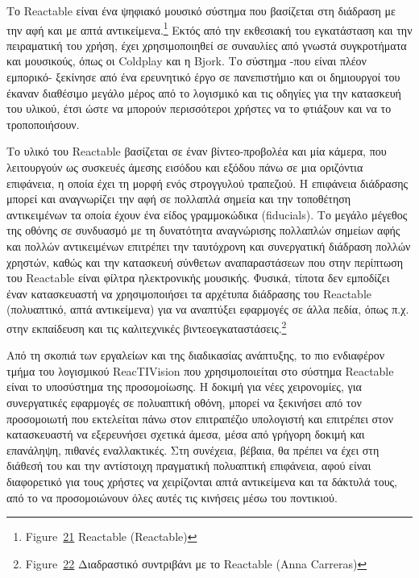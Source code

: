 \documentclass[
]{article}
\begin{document}
Το Reactable είναι ένα ψηφιακό μουσικό σύστημα που βασίζεται στη
διάδραση με την αφή και με απτά αντικείμενα.\footnote{Figure~\protect\hyperlink{fig:reactable-music}{21}
  Reactable (Reactable)} Εκτός από την εκθεσιακή του εγκατάσταση και την
πειραματική του χρήση, έχει χρησιμοποιηθεί σε συναυλίες από γνωστά
συγκροτήματα και μουσικούς, όπως οι Coldplay και η Bjork. Το σύστημα
-που είναι πλέον εμπορικό- ξεκίνησε από ένα ερευνητικό έργο σε
πανεπιστήμιο και οι δημιουργοί του έκαναν διαθέσιμο μεγάλο μέρος από το
λογισμικό και τις οδηγίες για την κατασκευή του υλικού, έτσι ώστε να
μπορούν περισσότεροι χρήστες να το φτιάξουν και να το τροποποιήσουν.

Το υλικό του Reactable βασίζεται σε έναν βίντεο-προβολέα και μία κάμερα,
που λειτουργούν ως συσκευές άμεσης εισόδου και εξόδου πάνω σε μια
οριζόντια επιφάνεια, η οποία έχει τη μορφή ενός στρογγυλού τραπεζιού. Η
επιφάνεια διάδρασης μπορεί και αναγνωρίζει την αφή σε πολλαπλά σημεία
και την τοποθέτηση αντικειμένων τα οποία έχουν ένα είδος γραμμοκώδικα
(fiducials). Το μεγάλο μέγεθος της οθόνης σε συνδυασμό με τη δυνατότητα
αναγνώρισης πολλαπλών σημείων αφής και πολλών αντικειμένων επιτρέπει την
ταυτόχρονη και συνεργατική διάδραση πολλών χρηστών, καθώς και την
κατασκευή σύνθετων αναπαραστάσεων που στην περίπτωση του Reactable είναι
φίλτρα ηλεκτρονικής μουσικής. Φυσικά, τίποτα δεν εμποδίζει έναν
κατασκευαστή να χρησιμοποιήσει τα αρχέτυπα διάδρασης του Reactable
(πολυαπτικό, απτά αντικείμενα) για να αναπτύξει εφαρμογές σε άλλα πεδία,
όπως π.χ. στην εκπαίδευση και τις καλιτεχνικές
βιντεοεγκαταστάσεις.\footnote{Figure~\protect\hyperlink{fig:reactable-fountain}{22}
  Διαδραστικό συντριβάνι με το Reactable (Anna Carreras)}

Από τη σκοπιά των εργαλείων και της διαδικασίας ανάπτυξης, το πιο
ενδιαφέρον τμήμα του λογισμικού ReacTIVision που χρησιμοποιείται στο
σύστημα Reactable είναι το υποσύστημα της προσομοίωσης. Η δοκιμή για
νέες χειρονομίες, για συνεργατικές εφαρμογές σε πολυαπτική οθόνη, μπορεί
να ξεκινήσει από τον προσομοιωτή που εκτελείται πάνω στον επιτραπέζιο
υπολογιστή και επιτρέπει στον κατασκευαστή να εξερευνήσει σχετικά άμεσα,
μέσα από γρήγορη δοκιμή και επανάληψη, πιθανές εναλλακτικές. Στη
συνέχεια, βέβαια, θα πρέπει να έχει στη διάθεσή του και την αντίστοιχη
πραγματική πολυαπτική επιφάνεια, αφού είναι διαφορετικό για τους χρήστες
να χειρίζονται απτά αντικείμενα και τα δάκτυλά τους, από το να
προσομοιώνουν όλες αυτές τις κινήσεις μέσω του ποντικιού.
\end{document}
